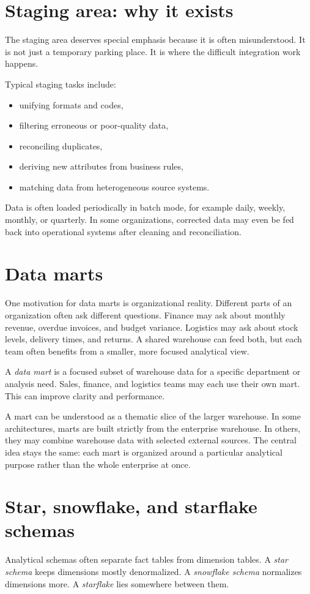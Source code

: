 \documentclass[11pt,a4paper,openany]{book}
\begin{document}
\section{Staging area: why it exists}
The staging area deserves special emphasis because it is often misunderstood. It is not just a temporary parking place. It is where the difficult integration work happens.

Typical staging tasks include:
\begin{itemize}
\item unifying formats and codes,
\item filtering erroneous or poor-quality data,
\item reconciling duplicates,
\item deriving new attributes from business rules,
\item matching data from heterogeneous source systems.
\end{itemize}

Data is often loaded periodically in batch mode, for example daily, weekly, monthly, or quarterly. In some organizations, corrected data may even be fed back into operational systems after cleaning and reconciliation.

\section{Data marts}
One motivation for data marts is organizational reality. Different parts of an organization often ask different questions. Finance may ask about monthly revenue, overdue invoices, and budget variance. Logistics may ask about stock levels, delivery times, and returns. A shared warehouse can feed both, but each team often benefits from a smaller, more focused analytical view.

A \emph{data mart} is a focused subset of warehouse data for a specific department or analysis need. Sales, finance, and logistics teams may each use their own mart. This can improve clarity and performance.

A mart can be understood as a thematic slice of the larger warehouse. In some architectures, marts are built strictly from the enterprise warehouse. In others, they may combine warehouse data with selected external sources. The central idea stays the same: each mart is organized around a particular analytical purpose rather than the whole enterprise at once.

\section{Star, snowflake, and starflake schemas}
Analytical schemas often separate fact tables from dimension tables. A \emph{star schema} keeps dimensions mostly denormalized. A \emph{snowflake schema} normalizes dimensions more. A \emph{starflake} lies somewhere between them.
\end{document}
